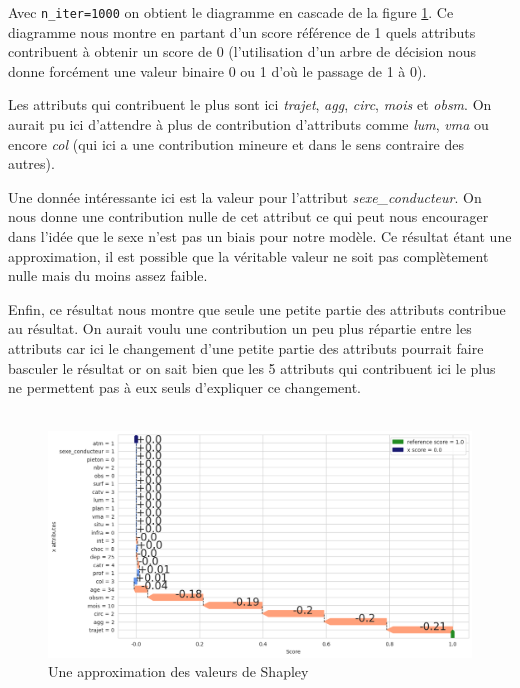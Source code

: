 \documentclass{article}
\begin{document}
    Avec \texttt{n\_iter=1000} on obtient le diagramme en cascade de la figure \ref{fig:fig_shap}. Ce diagramme 
    nous montre en partant d'un score référence de 1 quels attributs contribuent à obtenir un score de 0 (l'utilisation 
    d'un arbre de décision nous donne forcément une valeur binaire 0 ou 1 d'où le passage de 1 à 0).

    Les attributs qui contribuent le plus sont ici \textit{trajet}, \textit{agg}, \textit{circ}, \textit{mois} et 
    \textit{obsm}. On aurait pu ici d'attendre à plus de contribution d'attributs comme \textit{lum}, \textit{vma} ou 
    encore \textit{col} (qui ici a une contribution mineure et dans le sens contraire des autres).

    Une donnée intéressante ici est la valeur pour l'attribut \textit{sexe\_conducteur}. On nous donne une contribution 
    nulle de cet attribut ce qui peut nous encourager dans l'idée que le sexe n'est pas un biais pour notre modèle. 
    Ce résultat étant une approximation, il est possible que la véritable valeur ne soit pas complètement nulle mais 
    du moins assez faible.

    Enfin, ce résultat nous montre que seule une petite partie des attributs contribue au résultat. On aurait 
    voulu une contribution un peu plus répartie entre les attributs car ici le changement d'une petite partie
     des attributs pourrait faire basculer le résultat or on sait bien que les 5 attributs qui contribuent ici le 
     plus ne permettent pas à eux seuls d'expliquer ce changement. \\\\

    \begin{figure}[h]
        \centering
        \includegraphics[width=\textwidth]{./img/shap1.png}
        \caption{Une approximation des valeurs de Shapley}
        \label{fig:fig_shap}
    \end{figure}
\end{document}
